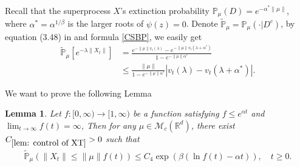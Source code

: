 \documentclass[12pt,oneside,english]{amsart}
\theoremstyle{plain}
\newtheorem{lem}[thm]{Lemma}
\theoremstyle{definition}
\numberwithin{equation}{section}
\begin{document}
Recall that the superprocess $X$'s extinction probability $\mathbb{P}_{\mu}(D)=e^{-\alpha^*\|\mu\|}$, where $\alpha^*=\alpha^{1/\beta}$ is the larger roots of $\psi(z)=0$. Denote $\mathbb{\tilde{P}}_{\mu}=\mathbb{P}_{\mu}(\cdot|D^c)$, by equation (3.48) in \cite{Li2011Measure-valued} and formula \eqref{CSBP}, we easily get
\begin{align}
    \mathbb{\tilde{P}}_{\mu}[e^{-\lambda \|X_t\|}]&=\frac{e^{-\|\mu\|v_t(\lambda)}-e^{-\|\mu\|v_t(\lambda+\alpha^*)}}{1-e^{-\|\mu\|\alpha^*}}\nonumber\\
        &\leq \frac{\|\mu\|}{1-e^{-\|\mu\|\alpha^*}}\left|v_t(\lambda)-v_t(\lambda+\alpha^*)\right|. \label{laplaceexpress}
\end{align}

We want to prove the following Lemma
\begin{lem}\label{lem: control of XT}
Let $f:[0,\infty)\rightarrow[1,\infty)$ be a function satisfying $f\leq e^{\alpha t}$ and $\lim_{t\rightarrow \infty}f(t)=\infty$, Then for any $\mu\in \mathcal M_c(\mathbb R^d)$, there exist $C_{\ref{lem: control of XT}}>0$ such that 
\begin{align}
    \mathbb{\tilde{P}}_{\mu}(\|X_t\|\leq \|\mu\|f(t))\leq C_4 \exp(\beta(\ln f(t)-\alpha t)), \quad t\geq 0.
\end{align}
\end{lem}
\end{document}
